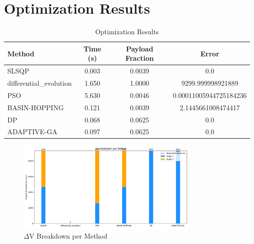\documentclass{article}
\begin{document}
\section{Optimization Results}
\begin{table}[h]
\centering
\begin{tabular}{|l|c|c|c|}
\hline
Method & Time (s) & Payload Fraction & Error \\
\hline
SLSQP & 0.003 & 0.0039 & 0.0 \\
differential\_evolution & 1.650 & 1.0000 & 9299.999998921889 \\
PSO & 5.630 & 0.0046 & 0.00011005944725184236 \\
BASIN-HOPPING & 0.121 & 0.0039 & 2.1445661008474417 \\
DP & 0.068 & 0.0625 & 0.0 \\
ADAPTIVE-GA & 0.097 & 0.0625 & 0.0 \\
\hline
\end{tabular}
\caption{Optimization Results}
\end{table}
\begin{figure}[h]
\centering
\includegraphics[width=0.8\textwidth]{dv_breakdown.png}
\caption{$\Delta$V Breakdown per Method}
\end{figure}
\end{document}
